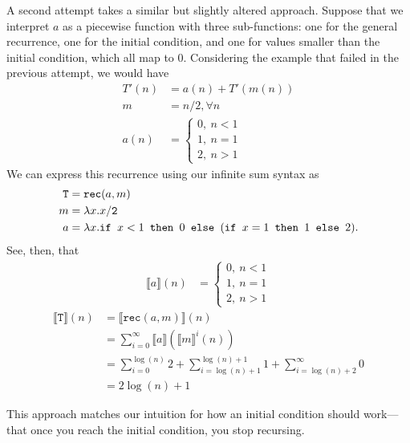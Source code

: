 A second attempt takes a similar but slightly altered approach. Suppose that we interpret $a$ as a piecewise function with three sub-functions:
one for the general recurrence, one for the initial condition, and one for values smaller than the initial condition, which all
map to $0$. Considering the example that failed in the previous attempt, we would have
\begin{align*}
T'(n) &= a(n) + T'(m(n)) \\
m &= n/2, \forall n \\
a(n) &=
\begin{cases}
0, \ n < 1 \\
1, \ n = 1 \\
2, \ n > 1
\end{cases}
\end{align*}
We can express this recurrence using our infinite sum syntax as
\begin{align*}
\texttt{T} &= \texttt{rec}(a,m) \\
m &= \lambda x.x/\texttt{2} \\
a &= \lambda x.\texttt{if } x <1 \texttt{ then } 0 \texttt{ else } (\texttt{if } x = 1 \texttt{ then } 1 \texttt{ else } 2).
\end{align*}
See, then, that
\begin{align*}
\llbracket a \rrbracket(n) &= 
 \begin{cases}
0, \ n < 1 \\
1, \ n = 1 \\
2, \ n > 1 
\end{cases} 
\end{align*}
\begin{align*}
\llbracket \texttt{T} \rrbracket(n) &= \llbracket \texttt{rec}(a,m)\rrbracket(n) \\
&= \sum_{i=0}^{\infty}\llbracket a \rrbracket(\llbracket m\rrbracket^i(n)) \\
&= \sum_{i=0}^{\log(n)} 2 + \sum_{i=\log(n)+1 }^{\log(n)+1} 1 + \sum_{i = \log(n) + 2}^{\infty} 0 \\
&= 2\log(n) + 1
\end{align*}

This approach matches our intuition for how an initial condition should work---that once you reach the initial condition,
you stop recursing. 

